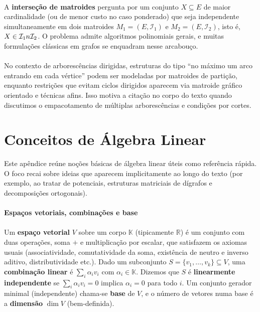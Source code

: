 \documentclass[12pt,a4paper]{article}
\def\cap{\string n}%
\begin{document}
\paragraph{}
A \textbf{interseção de matroides} pergunta por um conjunto $X\subseteq E$ de maior cardinalidade (ou de menor custo no caso ponderado) que seja independente simultaneamente em dois matroides $M_1=(E,\mathcal{I}_1)$ e $M_2=(E,\mathcal{I}_2)$, isto é, $X\in\mathcal{I}_1\cap\mathcal{I}_2$. O problema admite algoritmos polinomiais gerais, e muitas formulações clássicas em grafos se enquadram nesse arcabouço.

\paragraph{}
No contexto de arborescências dirigidas, estruturas do tipo “no máximo um arco entrando em cada vértice” podem ser modeladas por matroides de partição, enquanto restrições que evitam ciclos dirigidos aparecem via matroide gráfico orientado e técnicas afins. Isso motiva a citação no corpo do texto quando discutimos o empacotamento de múltiplas arborescências e condições por cortes.





\section{Conceitos de Álgebra Linear}
\label{ap:algebra-linear}
Este apêndice reúne noções básicas de álgebra linear úteis como referência rápida. O foco recai sobre ideias que aparecem implicitamente ao longo do texto (por exemplo, ao tratar de potenciais, estruturas matriciais de dígrafos e decomposições ortogonais).

\paragraph{Espaços vetoriais, combinações e base}
\paragraph{}
Um \textbf{espaço vetorial} $V$ sobre um corpo $\mathbb{K}$ (tipicamente $\mathbb{R}$) é um conjunto com duas operações, soma $+$ e multiplicação por escalar, que satisfazem os axiomas usuais (associatividade, comutatividade da soma, existência de neutro e inverso aditivo, distributividade etc.). Dado um subconjunto $S=\{v_1,\dots,v_k\}\subseteq V$, uma \textbf{combinação linear} é $\sum_i \alpha_i v_i$ com $\alpha_i\in\mathbb{K}$. Dizemos que $S$ é \textbf{linearmente independente} se $\sum_i \alpha_i v_i=0$ implica $\alpha_i=0$ para todo $i$. Um conjunto gerador minimal (independente) chama-se \textbf{base} de $V$, e o número de vetores numa base é a \textbf{dimensão} $\dim V$ (bem-definida).
\end{document}
